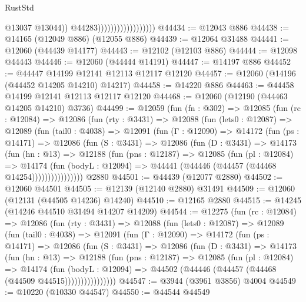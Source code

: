 \begin{lexlean}{RustStd}
\begin{coremodule}
                                            @13037
                                            @13044))
                                        @44283))))))))))))))))))
@44434 := @12043 @886
@44438 := @14165 (@12049 @886) (@12055 @886)
@44439 := @12064 @31488
@44441 := @12060 (@44439 @14177)
@44443 := @12102 (@12103 @886)
@44444 := @12098 @44443
@44446 := @12060 (@44444 @14191)
@44447 := @14197 @886
@44452 := @44447 @14199 @12141 @12113 @12117 @12120
@44457 := @12060 (@14196 (@44452 @14205 @14210) @14217)
@44458 := @14220 @886
@44463 := @44458 @14199 @12141 @12113 @12117 @12120
@44468 := @12060 (@12190 (@44463 @14205 @14210) @3736)
@44499 := @12059
    (fun (fn : @302) =>
    @12085
      (fun (rc : @12084) =>
      @12086
        (fun (rty : @3431) =>
        @12088
          (fun (lets0 : @12087) =>
          @12089
            (fun (tail0 : @4038) =>
            @12091
              (fun (Γ : @12090) =>
              @14172
                (fun (ps : @14171) =>
                @12086
                  (fun (S : @3431) =>
                  @12086
                    (fun (D : @3431) =>
                    @14173
                      (fun (hn : @13) =>
                      @12188
                        (fun (pns : @12187) =>
                        @12085
                          (fun (pl : @12084) =>
                          @14174
                            (fun (bodyL : @12094) =>
                            @44441 (@44446 (@44457 (@44468 @14254))))))))))))))))
    @2880
@44501 := @44439 (@12077 @2880)
@44502 := @12060 @44501
@44505 := @12139 (@12140 @2880) @31491
@44509 := @12060 (@12131 (@44505 @14236) @14240)
@44510 := @12165 @2880
@44515 := @14245 (@14246 @44510 @31494 @14207 @14209)
@44544 := @12275
    (fun (rc : @12084) =>
    @12086
      (fun (rty : @3431) =>
      @12088
        (fun (lets0 : @12087) =>
        @12089
          (fun (tail0 : @4038) =>
          @12091
            (fun (Γ : @12090) =>
            @14172
              (fun (ps : @14171) =>
              @12086
                (fun (S : @3431) =>
                @12086
                  (fun (D : @3431) =>
                  @14173
                    (fun (hn : @13) =>
                    @12188
                      (fun (pns : @12187) =>
                      @12085
                        (fun (pl : @12084) =>
                        @14174
                          (fun (bodyL : @12094) =>
                          @44502 (@44446 (@44457 (@44468 (@44509 @44515))))))))))))))))
@44547 := @3944 (@3961 @3856) @4004
@44549 := @10220 (@10330 @44547)
@44550 := @44544 @44549

\end{coremodule}
\end{lexlean}

